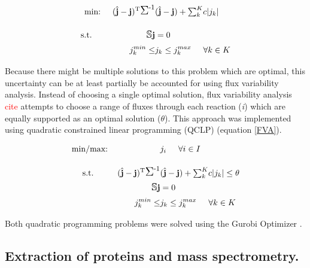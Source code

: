 \documentclass[12pt]{nature}\usepackage{graphicx, color}
\begin{document}
\begin{align}
\text{min:} \hspace{5mm} (\hat{\mathbf{j}} - \mathbf{j})^{\text{T}}\mathlarger{\mathlarger{\Sigma}}^{\text{-1}}&(\hat{\mathbf{j}} - \mathbf{j}) + \mathsmaller{\sum_{k}^{K}}c|j_{k}| \notag\\[1em]
\text{s.t.} \hspace{23mm} \mathlarger{\mathbb{S}}\mathbf{j} &= 0 \notag\\
\hspace{5mm} j_{k}^{min} \le &j_{k} \le j_{k}^{max} \hspace{5mm}\forall k \in K \label{QP}
\end{align}

Because there might be multiple solutions to this problem which are optimal, this uncertainty can be at least partially be accounted for using flux variability analysis.  Instead of choosing a single optimal solution, flux variability analysis \textcolor{red}{cite} attempts to choose a range of fluxes through each reaction (\textit{i}) which are equally supported as an optimal solution ($\theta$).  This approach was implemented using quadratic constrained linear programming (QCLP) (equation \ref{FVA}).  

\begin{align}
\text{min/max:} \hspace{22mm} & j_{i}\hspace{5mm}\forall i \in I\notag\\[1em]
\text{s.t.} \hspace{10mm} (\hat{\mathbf{j}} - \mathbf{j})^{\text{T}}\mathlarger{\mathlarger{\Sigma}}^{\text{-1}}&(\hat{\mathbf{j}} - \mathbf{j}) + \mathsmaller{\sum_{k}^{K}}c|j_{k}| \le \theta \notag\\
\mathlarger{\mathbb{S}}\mathbf{j} &= 0 \notag\\
\hspace{5mm} j_{k}^{min} \le &j_{k} \le j_{k}^{max} \hspace{5mm}\forall k \in K \label{FVA}
\end{align}

Both quadratic programming problems were solved using the Gurobi Optimizer \cite{Anonymous:WfN-MQJY}.

\subsection{Extraction of proteins and mass spectrometry.}
\end{document}
